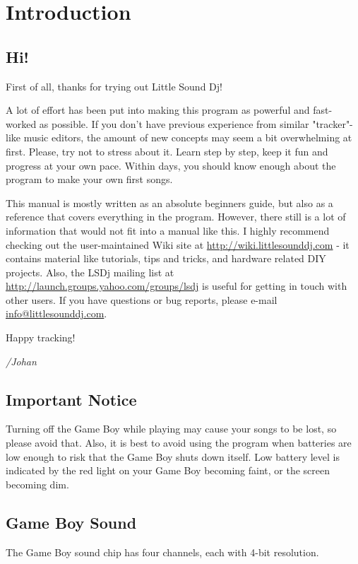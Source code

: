 \chapter{Introduction}
\section{Hi!}
First of all, thanks for trying out Little Sound Dj!

A lot of effort has been put into making this program as powerful and fast-worked
as possible. If you don't have previous experience from similar "tracker"-like
music editors, the amount of new concepts may seem a bit overwhelming at first.
Please, try not to stress about it. Learn step by step, keep it fun and progress
at your own pace. Within days, you should know enough about the
program to make your own first songs.

This manual is mostly written as an absolute beginners guide, but also as a reference
that covers everything in the program. However, there still
is a lot of information that would not fit into a manual like this. I highly recommend
checking out the user-maintained Wiki site at \url{http://wiki.littlesounddj.com} -
it contains material like tutorials, tips and tricks, and
hardware related DIY projects. Also, the LSDj mailing list
at \url{http://launch.groups.yahoo.com/groups/lsdj} is useful for getting in touch
with other users.
If you have questions or bug reports, please e-mail
\href{mailto:info@littlesounddj.com}{info@littlesounddj.com}.

Happy tracking!

\textit{/Johan}

\section{Important Notice}

Turning off the Game Boy while playing may cause your songs to be lost, so please avoid that.
Also, it is best to avoid using the program when batteries are low enough to risk that the
Game Boy shuts down itself. Low battery level is indicated by the red light on your Game Boy
becoming faint, or the screen becoming dim.

\section{Game Boy Sound}
The Game Boy sound chip has four channels, each with 4-bit resolution.

